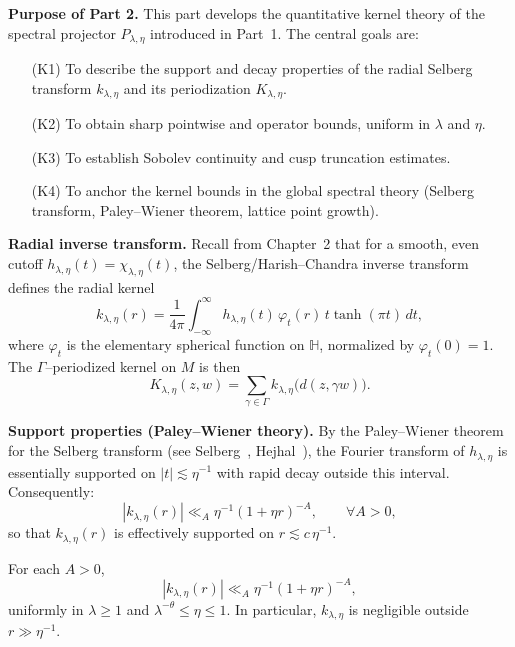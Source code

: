 \noindent\textbf{Purpose of Part 2.}
This part develops the quantitative kernel theory of the spectral projector
$P_{\lambda,\eta}$ introduced in Part~1.
The central goals are:
\begin{itemize}
  \item[(K1)] To describe the support and decay properties of the radial Selberg transform
  $k_{\lambda,\eta}$ and its periodization $K_{\lambda,\eta}$.
  \item[(K2)] To obtain sharp pointwise and operator bounds, uniform in $\lambda$ and $\eta$.
  \item[(K3)] To establish Sobolev continuity and cusp truncation estimates.
  \item[(K4)] To anchor the kernel bounds in the global spectral theory
  (Selberg transform, Paley–Wiener theorem, lattice point growth).
\end{itemize}

\medskip
\noindent\textbf{Radial inverse transform.}
Recall from Chapter~2 that for a smooth, even cutoff
$h_{\lambda,\eta}(t)=\chi_{\lambda,\eta}(t)$,
the Selberg/Harish–Chandra inverse transform defines the radial kernel
\[
  k_{\lambda,\eta}(r)
  = \frac{1}{4\pi}\int_{-\infty}^{\infty}
     h_{\lambda,\eta}(t)\,\varphi_{t}(r)\,t\tanh(\pi t)\,dt,
\]
where $\varphi_{t}$ is the elementary spherical function on $\mathbb{H}$,
normalized by $\varphi_t(0)=1$.
The $\Gamma$–periodized kernel on $M$ is then
\[
  K_{\lambda,\eta}(z,w)
  = \sum_{\gamma\in\Gamma} k_{\lambda,\eta}\!\big(d(z,\gamma w)\big).
\]

\medskip
\noindent\textbf{Support properties (Paley–Wiener theory).}
By the Paley–Wiener theorem for the Selberg transform
(see Selberg~\cite{Selberg1956}, Hejhal~\cite{Hejhal1983}),
the Fourier transform of $h_{\lambda,\eta}$ is essentially supported on
$|t|\lesssim \eta^{-1}$ with rapid decay outside this interval.
Consequently:
\begin{equation}\label{eq:support-k}
  |k_{\lambda,\eta}(r)| \ll_A \eta^{-1}(1+\eta r)^{-A},
  \qquad \forall A>0,
\end{equation}
so that $k_{\lambda,\eta}(r)$ is effectively supported on $r\lesssim c\,\eta^{-1}$.

\begin{lemma}
\label{lem:support}
For each $A>0$,
\[
  |k_{\lambda,\eta}(r)| \ll_A \eta^{-1}(1+\eta r)^{-A},
\]
uniformly in $\lambda\geq 1$ and $\lambda^{-\theta}\leq \eta\leq 1$.
In particular, $k_{\lambda,\eta}$ is negligible outside $r\gg \eta^{-1}$.
\end{lemma}

